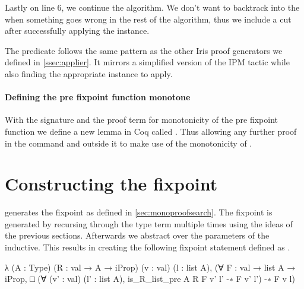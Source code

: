 \documentclass[thesis.tex]{subfiles}
\begin{document}
Lastly on line 6, we continue the algorithm. We don't want to backtrack into the  when something goes wrong in the rest of the algorithm, thus we include a cut after successfully applying the  instance.

The predicate  follows the same pattern as the other Iris proof generators we defined in \cref{ssec:applier}. It mirrors a simplified version of the IPM  tactic while also finding the appropriate  instance to apply.

\paragraph{Defining the pre fixpoint function monotone}
With the signature and the proof term for monotonicity of the pre fixpoint function we define a new lemma in Coq called . Thus allowing any further proof in the command and outside it to make use of the monotonicity of .

\section{Constructing the fixpoint}\label{sec:constrfixpoint}
 generates the fixpoint as defined in \cref{sec:monoproofsearch}. The fixpoint is generated by recursing through the type term multiple times using the ideas of the previous sections. Afterwards we abstract over the parameters of the inductive. This results in creating the following fixpoint statement defined as .
\begin{coqcode}
  λ (A : Type) (R : val → A → iProp) 
    (v : val) (l : list A),
    (∀ F : val → list A → iProp, 
      □ (∀ (v' : val) (l' : list A), 
            is_R_list_pre A R F v' l' -∗ F v' l') 
      -∗ F v l)
\end{coqcode}
\end{document}

